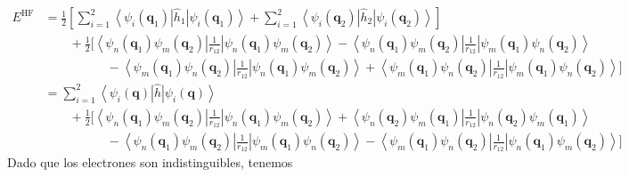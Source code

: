 \documentclass[10pt]{article}
\begin{document}
\begin{align}
 E^{\mathrm{HF}}
 &=\frac{1}{2}\left[ \sum_{i=1}^2 \left< \psi_i(\mathbf{q}_1)\right|\hat{h}_1\left| \psi_i(\mathbf{q}_1)\right> + 
 \sum_{i=1}^2 \left<\psi_i(\mathbf{q}_2)\right|\hat{h}_2\left|\psi_i(\mathbf{q}_2)\right> \right]
 \\ &\qquad
+\frac{1}{2}\bigg[\left<\psi_n(\mathbf{q}_1)\psi_m(\mathbf{q}_2) \right|
\frac{1}{r_{12}} \left|\psi_n(\mathbf{q}_1)\psi_m(\mathbf{q}_2) \right>
-\left<\psi_n(\mathbf{q}_1)\psi_m(\mathbf{q}_2)\right|\frac{1}{r_{12}}\left|
\psi_m(\mathbf{q}_1)\psi_n(\mathbf{q}_2)\right>
 \\ &\qquad\qquad\quad
-\left<\psi_m(\mathbf{q}_1)\psi_n(\mathbf{q}_2)\right|\frac{1}{r_{12}}\left|
\psi_n(\mathbf{q}_1)\psi_m(\mathbf{q}_2)\right>
+\left<\psi_m(\mathbf{q}_1)\psi_n(\mathbf{q}_2)\right|\frac{1}{r_{12}}\left|
 \psi_m(\mathbf{q}_1)\psi_n(\mathbf{q}_2) \right> \bigg]\\
 &=\sum_{i=1}^2 \left< \psi_i(\mathbf{q})\right|\hat{h}\left| \psi_i(\mathbf{q})\right> 
 \\ &\qquad
+\frac{1}{2}\bigg[
\left<\psi_n(\mathbf{q}_1)\psi_m(\mathbf{q}_2)
\right|\frac{1}{r_{12}} \left|
\psi_n(\mathbf{q}_1)\psi_m(\mathbf{q}_2) \right> +
\left<\psi_n(\mathbf{q}_2)\psi_m(\mathbf{q}_1)
\right|\frac{1}{r_{12}} \left|
 \psi_n(\mathbf{q}_2)\psi_m(\mathbf{q}_1)\right>
 \\ &\qquad\qquad\quad
-\left<\psi_n(\mathbf{q}_1)\psi_m(\mathbf{q}_2)\right|\frac{1}{r_{12}}\left|
\psi_m(\mathbf{q}_1)\psi_n(\mathbf{q}_2)\right>
-\left<\psi_m(\mathbf{q}_1)\psi_n(\mathbf{q}_2)\right|\frac{1}{r_{12}}\left|
\psi_n(\mathbf{q}_1)\psi_m(\mathbf{q}_2)\right>\bigg] 
\end{align}
Dado que los electrones son indistinguibles, tenemos
\end{document}
